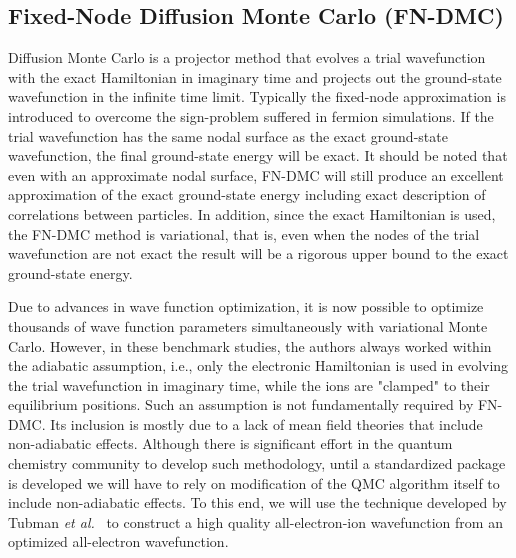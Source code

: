 \documentclass[pra,superscriptaddress,groupedaddress,twocolumn]{revtex4}
\begin{document}
\subsection{Fixed-Node Diffusion Monte Carlo (FN-DMC)}
Diffusion Monte Carlo is a projector method that evolves a trial wavefunction with the exact Hamiltonian in imaginary time and projects out the ground-state wavefunction in the infinite time limit. 
Typically the fixed-node approximation is introduced to overcome the sign-problem suffered in fermion simulations. %
 If the trial wavefunction has the same nodal surface as the exact ground-state wavefunction, the final ground-state energy will be exact. It should be noted that even with an approximate nodal surface, FN-DMC will still produce an excellent approximation of the exact ground-state energy including exact description of correlations between particles. 
 In addition, since the exact Hamiltonian is used, the FN-DMC method is variational, that is, even when the nodes of the trial wavefunction are not exact the result will be a rigorous upper bound to the exact ground-state energy.

Due to advances in wave function optimization, it is now possible to optimize thousands of wave function parameters simultaneously with variational Monte Carlo.   %
However, in these benchmark studies, the authors always worked within the adiabatic assumption, i.e., only the electronic Hamiltonian is used in evolving the trial wavefunction in imaginary time, while the ions are "clamped" to their equilibrium positions. Such an assumption is not fundamentally required by FN-DMC. Its inclusion is mostly due to a lack of mean field theories that include non-adiabatic effects. Although there is significant effort in the quantum chemistry community to develop such methodology, until a standardized package is developed we will have to rely on modification of the QMC algorithm itself to include non-adiabatic effects. To this end, we will use the technique developed by Tubman {\it et al.}~\cite{Tubman_ECG} to construct a high quality all-electron-ion wavefunction from an optimized all-electron wavefunction.
\end{document}
